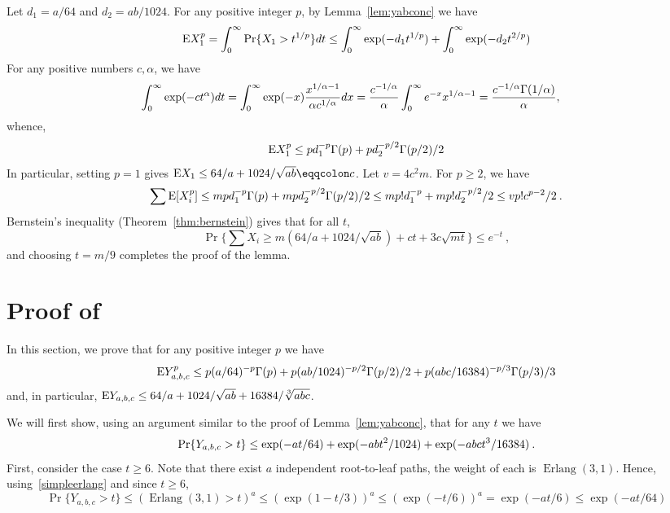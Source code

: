 \documentclass{patmorin}
\DeclareMathOperator{\erlang}{Erlang}
\begin{document}
Let $d_1 = a/64$ and $d_2=ab/1024$.
For any positive integer $p$, by Lemma~\ref{lem:yabconc} we have
\[
\mathrm{E} X_1^p = \int_0^{\infty} \Pr \{X_1>t^{1/p}\}dt
\leq
\int_0^{\infty} \exp(-d_1 t^{1/p}) + \int_0^{\infty} \exp(-d_2 t^{2/p})
\]
For any positive numbers $c,\alpha$, we have
\begin{align}
\int_0^{\infty} \exp(-c t^{\alpha}) dt
& = 
\int_0^{\infty} \exp(-x) \frac {x^{1/\alpha-1}}{\alpha c^{1/\alpha}}dx
=
\frac{c^{-1/\alpha}}{\alpha}\int_0^{\infty}
e^{-x}x^{1/\alpha-1}
= \frac{c^{-1/\alpha}\Gamma(1/\alpha)}{\alpha},
\eqlabel{expintegral}
\end{align}
whence,
\[
\mathrm{E} X_1^p \leq pd_1^{-p}\Gamma(p)
+ pd_2^{-p/2}\Gamma(p/2)/2
\]
In particular, setting $p=1$ gives $\E X_1 \leq 64/a+1024/\sqrt{ab}\eqqcolon c$.
Let $v=4c^2m$.
For $p\geq 2$, we have
\begin{align*}
\sum \mathrm{E} [X_i^p] 
\leq
mpd_1^{-p}\Gamma(p)
+ mpd_2^{-p/2}\Gamma(p/2)/2
\leq
m p! d_1^{-p}
+ m p! d_2^{-p/2}/2
\leq v p! c^{p-2}/2\:.
\end{align*}
Bernstein's inequality (Theorem~\ref{thm:bernstein}) gives that for all $t$,
\[
\Pr \{\sum X_i \geq 
m \left(64/a+1024/\sqrt{ab}\right)
+ ct + 3c\sqrt {mt} \} \leq e^{-t}\:,
\]
and choosing $t=m/9$ completes the proof of the lemma.



\section{Proof of~}
In this section, we prove that for any positive integer $p$ we have
\[
\mathrm{E} Y_{a,b,c}^p \leq
 p (a/64)^{-p}\Gamma(p)
+ p(ab/1024)^{-p/2}\Gamma(p/2)/2
+ p(abc/16384)^{-p/3}\Gamma(p/3)/3
\]
and, in particular,
$\mathrm{E} Y_{a,b,c} \leq 64/a+1024/\sqrt{ab} + 16384/\sqrt[3]{abc}$.


We will first show, using an argument similar to the proof of Lemma~\ref{lem:yabconc}, that
for any $t$ we have
\begin{equation}
\eqlabel{tailyabc}
\Pr\{Y_{a,b,c}>t\} \leq \exp(-at/64)+\exp(-abt^2/1024)+\exp(-abct^3/16384) \:.
\end{equation}
First, consider the case $t\geq6$.
Note that there exist $a$ independent root-to-leaf paths, the weight of each is $\erlang(3,1)$.
Hence, using~\eqref{simpleerlang} and since $t\geq6$,
\[
\Pr\{Y_{a,b,c}>t\}
\leq
\left(\erlang(3,1)>t\right)^a
\leq
(\exp(1-t/3))^a
\leq
(\exp(-t/6))^a
=\exp(-at/6) \leq\exp(-at/64)
\]
\end{document}
